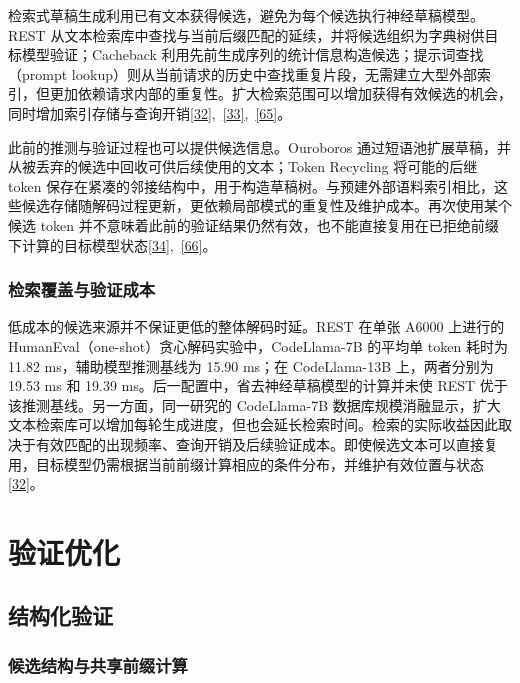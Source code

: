 \documentclass[11pt,a4paper,UTF8,fontset=none,scheme=plain,zihao=-4]{ctexart}
\begin{document}
检索式草稿生成利用已有文本获得候选，避免为每个候选执行神经草稿模型。REST
从文本检索库中查找与当前后缀匹配的延续，并将候选组织为字典树供目标模型验证；Cacheback
利用先前生成序列的统计信息构造候选；提示词查找（prompt
lookup）则从当前请求的历史中查找重复片段，无需建立大型外部索引，但更加依赖请求内部的重复性。扩大检索范围可以增加获得有效候选的机会，同时增加索引存储与查询开销\protect\hyperlink{ref-rest}{{[}32{]}},~\protect\hyperlink{ref-cacheback}{{[}33{]}},~\protect\hyperlink{ref-vllmdocs}{{[}65{]}}。

此前的推测与验证过程也可以提供候选信息。Ouroboros
通过短语池扩展草稿，并从被丢弃的候选中回收可供后续使用的文本；Token
Recycling 将可能的后继 token
保存在紧凑的邻接结构中，用于构造草稿树。与预建外部语料索引相比，这些候选存储随解码过程更新，更依赖局部模式的重复性及维护成本。再次使用某个候选
token
并不意味着此前的验证结果仍然有效，也不能直接复用在已拒绝前缀下计算的目标模型状态\protect\hyperlink{ref-tokenrecycling}{{[}34{]}},~\protect\hyperlink{ref-ouroboros}{{[}66{]}}。

\hypertarget{section-3-4-2}{%
\subsubsection{检索覆盖与验证成本}\label{section-3-4-2}}

低成本的候选来源并不保证更低的整体解码时延。REST 在单张 A6000 上进行的
HumanEval（one-shot）贪心解码实验中，CodeLlama-7B 的平均单 token 耗时为
11.82 ms，辅助模型推测基线为 15.90 ms；在 CodeLlama-13B 上，两者分别为
19.53 ms 和 19.39 ms。后一配置中，省去神经草稿模型的计算并未使 REST
优于该推测基线。另一方面，同一研究的 CodeLlama-7B
数据库规模消融显示，扩大文本检索库可以增加每轮生成进度，但也会延长检索时间。检索的实际收益因此取决于有效匹配的出现频率、查询开销及后续验证成本。即使候选文本可以直接复用，目标模型仍需根据当前前缀计算相应的条件分布，并维护有效位置与状态\protect\hyperlink{ref-rest}{{[}32{]}}。

\hypertarget{section-4}{%
\section{验证优化}\label{section-4}}

\hypertarget{section-4-1}{%
\subsection{结构化验证}\label{section-4-1}}

\hypertarget{section-4-1-1}{%
\subsubsection{候选结构与共享前缀计算}\label{section-4-1-1}}
\end{document}
